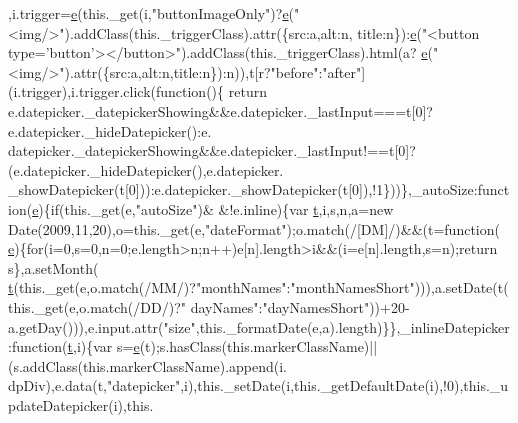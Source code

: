 \begin{DoxyCode}
      ,i.trigger=\hyperlink{jquery-ui_8min_8js_a2c038346d47955cbe2cb91e338edd7e1}{e}(this.\_get(i,\textcolor{stringliteral}{"buttonImageOnly"})?\hyperlink{jquery-ui_8min_8js_a2c038346d47955cbe2cb91e338edd7e1}{e}(\textcolor{stringliteral}{"<img/>"}).addClass(this.\_triggerClass).attr(\{src:a,alt:n,
      title:n\}):\hyperlink{jquery-ui_8min_8js_a2c038346d47955cbe2cb91e338edd7e1}{e}(\textcolor{stringliteral}{"<button type='button'></button>"}).addClass(this.\_triggerClass).html(a?
      \hyperlink{jquery-ui_8min_8js_a2c038346d47955cbe2cb91e338edd7e1}{e}(\textcolor{stringliteral}{"<img/>"}).attr(\{src:a,alt:n,title:n\}):n)),t[r?\textcolor{stringliteral}{"before"}:\textcolor{stringliteral}{"after"}](i.trigger),i.trigger.click(\textcolor{keyword}{function}()\{\textcolor{keywordflow}{
      return} e.datepicker.\_datepickerShowing&&e.datepicker.\_lastInput===t[0]?e.datepicker.\_hideDatepicker():e.
      datepicker.\_datepickerShowing&&e.datepicker.\_lastInput!==t[0]?(e.datepicker.\_hideDatepicker(),e.datepicker.
      \_showDatepicker(t[0])):e.datepicker.\_showDatepicker(t[0]),!1\}))\},\_autoSize:\textcolor{keyword}{function}(\hyperlink{jquery-ui_8min_8js_a2c038346d47955cbe2cb91e338edd7e1}{e})\{\textcolor{keywordflow}{if}(this.\_get(e,\textcolor{stringliteral}{"autoSize"})&
      &!e.inline)\{var \hyperlink{jquery-2_80_83_8min_8js_aaccc9105df5383111407fd5b41255e23}{t},i,s,n,a=\textcolor{keyword}{new} Date(2009,11,20),o=this.\_get(e,\textcolor{stringliteral}{"dateFormat"});o.match(/[DM]/)&&(t=\textcolor{keyword}{function}(
      \hyperlink{jquery-ui_8min_8js_a2c038346d47955cbe2cb91e338edd7e1}{e})\{\textcolor{keywordflow}{for}(i=0,s=0,n=0;e.length>n;n++)e[n].length>i&&(i=e[n].length,s=n);\textcolor{keywordflow}{return} s\},a.setMonth(
      \hyperlink{jquery-2_80_83_8min_8js_aaccc9105df5383111407fd5b41255e23}{t}(this.\_get(e,o.match(/MM/)?\textcolor{stringliteral}{"monthNames"}:\textcolor{stringliteral}{"monthNamesShort"}))),a.setDate(t(this.\_get(e,o.match(/DD/)?\textcolor{stringliteral}{"
      dayNames"}:\textcolor{stringliteral}{"dayNamesShort"}))+20-a.getDay())),e.input.attr(\textcolor{stringliteral}{"size"},this.\_formatDate(e,a).length)\}\},\_inlineDatepicker
      :\textcolor{keyword}{function}(\hyperlink{jquery-2_80_83_8min_8js_aaccc9105df5383111407fd5b41255e23}{t},i)\{var s=\hyperlink{jquery-ui_8min_8js_a2c038346d47955cbe2cb91e338edd7e1}{e}(t);s.hasClass(this.markerClassName)||(s.addClass(this.markerClassName).append(i.
      dpDiv),e.data(t,\textcolor{stringliteral}{"datepicker"},i),this.\_setDate(i,this.\_getDefaultDate(i),!0),this.\_updateDatepicker(i),this.

\end{DoxyCode}
